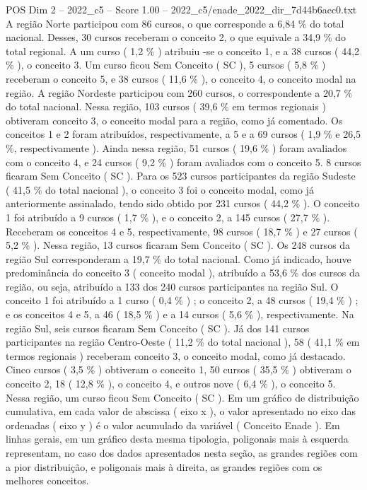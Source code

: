 \begin{textsample}{POS Dim 2 – 2022\_c5 – Score 1.00 – 2022\_c5/enade\_2022\_dir\_7d44b6aec0.txt}
A região Norte participou com 86 cursos, o que corresponde a 6,84 \% do total nacional.
Desses, 30 cursos receberam o conceito 2, o que equivale a 34,9 \% do total regional.
A um curso ( 1,2 \% ) atribuiu -se o conceito 1, e a 38 cursos ( 44,2 \% ), o conceito 3.
Um curso ficou Sem Conceito ( SC ), 5 cursos ( 5,8 \% ) receberam o conceito 5, e 38 cursos ( 11,6 \% ), o conceito 4, o conceito modal na região.
A região Nordeste participou com 260 cursos, o correspondente a 20,7 \% do total nacional.
Nessa região, 103 cursos ( 39,6 \% em termos regionais ) obtiveram conceito 3, o conceito modal para a região, como já comentado.
Os conceitos 1 e 2 foram atribuídos, respectivamente, a 5 e a 69 cursos ( 1,9 \% e 26,5 \%, respectivamente ).
Ainda nessa região, 51 cursos ( 19,6 \% ) foram avaliados com o conceito 4, e 24 cursos ( 9,2 \% ) foram avaliados com o conceito 5. 8 cursos ficaram Sem Conceito ( SC ).
Para os 523 cursos participantes da região Sudeste ( 41,5 \% do total nacional ), o conceito 3 foi o conceito modal, como já anteriormente assinalado, tendo sido obtido por 231 cursos ( 44,2 \% ).
O conceito 1 foi atribuído a 9 cursos ( 1,7 \% ), e o conceito 2, a 145 cursos ( 27,7 \% ).
Receberam os conceitos 4 e 5, respectivamente, 98 cursos ( 18,7 \% ) e 27 cursos ( 5,2 \% ).
Nessa região, 13 cursos ficaram Sem Conceito ( SC ).
Os 248 cursos da região Sul corresponderam a 19,7 \% do total nacional.
Como já indicado, houve predominância do conceito 3 ( conceito modal ), atribuído a 53,6 \% dos cursos da região, ou seja, atribuído a 133 dos 240 cursos participantes na região Sul.
O conceito 1 foi atribuído a 1 curso ( 0,4 \% ) ; o conceito 2, a 48 cursos ( 19,4 \% ) ; e os conceitos 4 e 5, a 46 ( 18,5 \% ) e a 14 cursos ( 5,6 \% ), respectivamente.
Na região Sul, seis cursos ficaram Sem Conceito ( SC ).
Já dos 141 cursos participantes na região Centro-Oeste ( 11,2 \% do total nacional ), 58 ( 41,1 \% em termos regionais ) receberam conceito 3, o conceito modal, como já destacado.
Cinco cursos ( 3,5 \% ) obtiveram o conceito 1, 50 cursos ( 35,5 \% ) obtiveram o conceito 2, 18 ( 12,8 \% ), o conceito 4, e outros nove ( 6,4 \% ), o conceito 5.
Nessa região, um curso ficou Sem Conceito ( SC ).
Em um gráfico de distribuição cumulativa, em cada valor de abscissa ( eixo x ), o valor apresentado no eixo das ordenadas ( eixo y ) é o valor acumulado da variável ( Conceito Enade ).
Em linhas gerais, em um gráfico desta mesma tipologia, poligonais mais à esquerda representam, no caso dos dados apresentados nesta seção, as grandes regiões com a pior distribuição, e poligonais mais à direita, as grandes regiões com os melhores conceitos.

\end{textsample}
